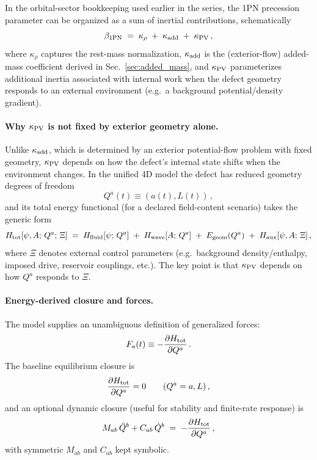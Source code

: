 \documentclass[11pt]{article}
\begin{document}
In the orbital-sector bookkeeping used earlier in the series, the 1PN precession parameter can be
organized as a sum of inertial contributions, schematically
\begin{equation}
  \beta_{\rm 1PN}
  \;=\;
  \kappa_{\rho} \;+\; \kappa_{\rm add} \;+\; \kappa_{\rm PV}\,,
  \label{eq:beta_decomp}
\end{equation}
where $\kappa_{\rho}$ captures the rest-mass normalization, $\kappa_{\rm add}$ is the (exterior-flow)
added-mass coefficient derived in Sec.~\ref{sec:added_mass}, and $\kappa_{\rm PV}$ parameterizes
additional inertia associated with internal work when the defect geometry responds to an external
environment (e.g.\ a background potential/density gradient).

\paragraph{Why $\kappa_{\rm PV}$ is not fixed by exterior geometry alone.}
Unlike $\kappa_{\rm add}$, which is determined by an exterior potential-flow problem with fixed
geometry, $\kappa_{\rm PV}$ depends on how the defect's internal state shifts when the environment
changes. In the unified 4D model the defect has reduced geometry degrees of freedom
\begin{equation}
  Q^a(t)\equiv (a(t),L(t))\,,
\end{equation}
and its total energy functional (for a declared field-content scenario) takes the generic form
\begin{equation}
  H_{\rm tot}[\psi,A;\,Q^a;\,\Xi]
  \;=\;
  H_{\rm fluid}[\psi;\,Q^a]
  \;+\;
  H_{\rm wave}[A;\,Q^a]
  \;+\;
  E_{\rm geom}(Q^a)
  \;+\;
  H_{\rm aux}[\psi,A;\,\Xi]\,,
  \label{eq:Htot_generic}
\end{equation}
where $\Xi$ denotes external control parameters (e.g.\ background density/enthalpy, imposed drive,
reservoir couplings, etc.). The key point is that $\kappa_{\rm PV}$ depends on how $Q^a$ responds to $\Xi$.

\paragraph{Energy-derived closure and forces.}
The model supplies an unambiguous definition of generalized forces:
\begin{equation}
  F_a(t)\equiv -\frac{\partial H_{\rm tot}}{\partial Q^a}\,.
  \label{eq:Fa_def}
\end{equation}
The baseline equilibrium closure is
\begin{equation}
  \frac{\partial H_{\rm tot}}{\partial Q^a}=0
  \qquad (Q^a=a,L)\,,
  \label{eq:equilibrium_closure}
\end{equation}
and an optional dynamic closure (useful for stability and finite-rate response) is
\begin{equation}
  M_{ab}\,\ddot Q^b + C_{ab}\,\dot Q^b
  \;=\;
  -\frac{\partial H_{\rm tot}}{\partial Q^a}\,,
  \label{eq:dynamic_wall_law}
\end{equation}
with symmetric $M_{ab}$ and $C_{ab}$ kept symbolic.
\end{document}

